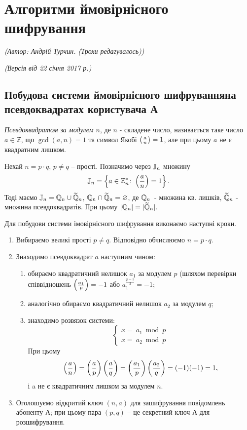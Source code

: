 \section{Алгоритми ймовірнісного шифрування}
\begin{flushright}
\emph{(Автор: Андрій Турчин. (Трохи редагувалось))}
\par \emph{(Версія від 22 січня 2017 р.)}
\end{flushright}

\subsection{Побудова системи ймовірнісного шифруванняна псевдоквадратах користувача А}

\begin{mydef}
\emph{Псевдоквадратом за модулем $n$}, де $n$ - складене число, називається таке число
$a \in \mathbb{Z}$, що $\gcd(a, n) = 1$ та символ Якобі $\left(\frac{a}{n}\right) = 1$, але при 
цьому $a$ не є квадратним лишком.
\end{mydef}

Нехай $n = p \cdot q$, $p \neq q$ -- прості. Позначимо через $\mathbb J_{n}$ множину 
$$\mathbb J_{n} = \left\{a \in \mathbb Z^{*}_{n} \colon \left(\frac{a}{n}\right) = 1 \right\}.$$
Тоді маємо $\mathbb J_{n} = \mathbb Q_{n} \cup \widetilde{\mathbb Q}_{n}$,  $\mathbb Q_{n} \cap 
\widetilde{\mathbb Q}_{n} = \varnothing$, де $\mathbb Q_{n}$\ - множина кв. лишків, 
$\widetilde{\mathbb Q}_{n}$ - множина псевдоквадратів. При цьому 
$|\mathbb Q_{n}| = |\widetilde{\mathbb Q}_{n}|$.

Для побудови системи імовірнісного шифрування виконаємо наступні кроки.
\begin{enumerate}
\item Вибираємо великі прості $p \neq q$. Відповідно обчислюємо $n = p 
\cdot q$.

\item Знаходимо псевдоквадрат $a$ наступним чином:

\begin{enumerate}
\item обираємо квадратичний нелишок $a_{1}$ за модулем $p$ (шляхом перевірки співвідношень $\left(\frac{a_{1}}{p}\right) = -1$ 
або $a_{1}^{\frac{p-1}{2}} = -1$;
\item аналогічно обираємо квадратичний нелишок $a_{2}$ за модулем $q$;

\item знаходимо розвязок системи:
\begin{equation*} 
\begin{cases}
x =\ a_{1} \bmod p \\
x =\ a_{2} \bmod p
\end{cases}
\end{equation*}
При цьому 
$$\left(\frac{a}{n}\right) = \left(\frac{a}{p}\right) \left(\frac{a}{q}\right) = \left(\frac{a_{1}}{p}\right) \left(\frac{a_{2}}{q}\right) = (-1)(-1) = 1,$$
і a не є квадратичним лишком за модулем $n$.
\end{enumerate}

\item  Оголошуємо відкритий ключ $(n,a)$ для зашифрування повідомлень абоненту А; при цьому пара $(p,q)$ -- це секретний ключ А для розшифрування.
\end{enumerate}

